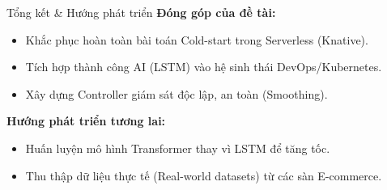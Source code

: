 \documentclass[10pt, aspectratio=169]{beamer}
\begin{document}
\begin{frame}{Tổng kết \& Hướng phát triển}
    \textbf{Đóng góp của đề tài:}
    \begin{itemize}
        \item Khắc phục hoàn toàn bài toán Cold-start trong Serverless (Knative).
        \item Tích hợp thành công AI (LSTM) vào hệ sinh thái DevOps/Kubernetes.
        \item Xây dựng Controller giám sát độc lập, an toàn (Smoothing).
    \end{itemize}
    \vspace{0.5cm}
    \pause
    \textbf{Hướng phát triển tương lai:}
    \begin{itemize}
        \item Huấn luyện mô hình Transformer thay vì LSTM để tăng tốc.
        \item Thu thập dữ liệu thực tế (Real-world datasets) từ các sàn E-commerce.
    \end{itemize}
\end{frame}
\end{document}
